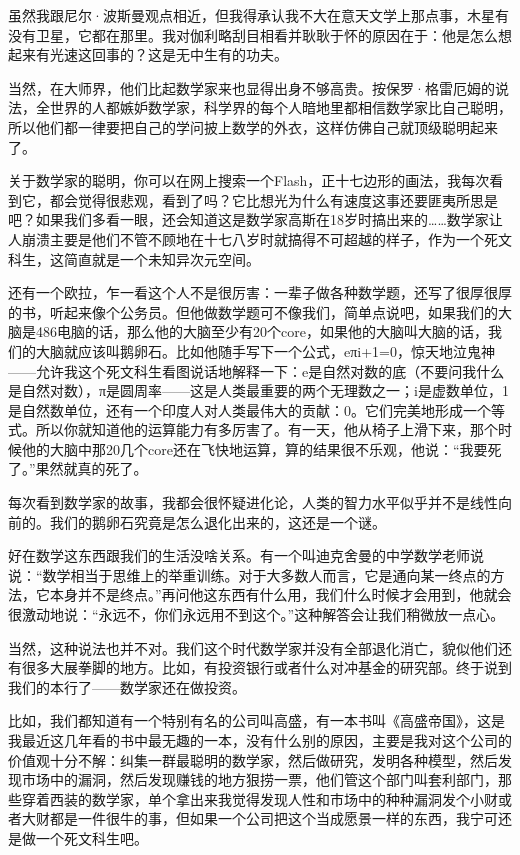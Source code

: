 虽然我跟尼尔·波斯曼观点相近，但我得承认我不大在意天文学上那点事，木星有没有卫星，它都在那里。我对伽利略刮目相看并耿耿于怀的原因在于：他是怎么想起来有光速这回事的？这是无中生有的功夫。

当然，在大师界，他们比起数学家来也显得出身不够高贵。按保罗·格雷厄姆的说法，全世界的人都嫉妒数学家，科学界的每个人暗地里都相信数学家比自己聪明，所以他们都一律要把自己的学问披上数学的外衣，这样仿佛自己就顶级聪明起来了。

关于数学家的聪明，你可以在网上搜索一个Flash，正十七边形的画法，我每次看到它，都会觉得很悲观，看到了吗？它比想光为什么有速度这事还要匪夷所思是吧？如果我们多看一眼，还会知道这是数学家高斯在18岁时搞出来的\ldots\ldots 数学家让人崩溃主要是他们不管不顾地在十七八岁时就搞得不可超越的样子，作为一个死文科生，这简直就是一个未知异次元空间。

还有一个欧拉，乍一看这个人不是很厉害：一辈子做各种数学题，还写了很厚很厚的书，听起来像个公务员。但他做数学题可不像我们，简单点说吧，如果我们的大脑是486电脑的话，那么他的大脑至少有20个core，如果他的大脑叫大脑的话，我们的大脑就应该叫鹅卵石。比如他随手写下一个公式，eπi+1=0，惊天地泣鬼神------允许我这个死文科生看图说话地解释一下：e是自然对数的底（不要问我什么是自然对数），π是圆周率------这是人类最重要的两个无理数之一；i是虚数单位，1是自然数单位，还有一个印度人对人类最伟大的贡献：0。它们完美地形成一个等式。所以你就知道他的运算能力有多厉害了。有一天，他从椅子上滑下来，那个时候他的大脑中那20几个core还在飞快地运算，算的结果很不乐观，他说：``我要死了。''果然就真的死了。

每次看到数学家的故事，我都会很怀疑进化论，人类的智力水平似乎并不是线性向前的。我们的鹅卵石究竟是怎么退化出来的，这还是一个谜。

好在数学这东西跟我们的生活没啥关系。有一个叫迪克舍曼的中学数学老师说说：``数学相当于思维上的举重训练。对于大多数人而言，它是通向某一终点的方法，它本身并不是终点。''再问他这东西有什么用，我们什么时候才会用到，他就会很激动地说：``永远不，你们永远用不到这个。''这种解答会让我们稍微放一点心。

当然，这种说法也并不对。我们这个时代数学家并没有全部退化消亡，貌似他们还有很多大展拳脚的地方。比如，有投资银行或者什么对冲基金的研究部。终于说到我们的本行了------数学家还在做投资。

比如，我们都知道有一个特别有名的公司叫高盛，有一本书叫《高盛帝国》，这是我最近这几年看的书中最无趣的一本，没有什么别的原因，主要是我对这个公司的价值观十分不解：纠集一群最聪明的数学家，然后做研究，发明各种模型，然后发现市场中的漏洞，然后发现赚钱的地方狠捞一票，他们管这个部门叫套利部门，那些穿着西装的数学家，单个拿出来我觉得发现人性和市场中的种种漏洞发个小财或者大财都是一件很牛的事，但如果一个公司把这个当成愿景一样的东西，我宁可还是做一个死文科生吧。

